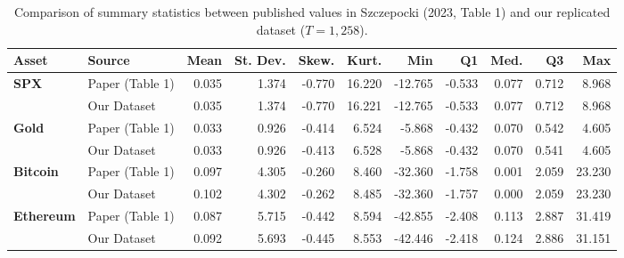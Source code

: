 \begin{table}[htbp]
\centering
\small
\caption{Comparison of summary statistics between published values in Szczepocki (2023, Table 1) and our replicated dataset ($T = 1{,}258$).}
\label{tab:comparison}
\vspace{0.5em}
\begin{tabular}{llrrrrrrrrr}
\toprule
\textbf{Asset} & \textbf{Source} & \textbf{Mean} & \textbf{St. Dev.} & \textbf{Skew.} & \textbf{Kurt.} & \textbf{Min} & \textbf{Q1} & \textbf{Med.} & \textbf{Q3} & \textbf{Max} \\
\midrule
\textbf{SPX}      & Paper (Table 1) & 0.035 & 1.374 & -0.770 & 16.220 & -12.765 & -0.533 & 0.077 & 0.712 &  8.968 \\
                  & Our Dataset     & 0.035 & 1.374 & -0.770 & 16.221 & -12.765 & -0.533 & 0.077 & 0.712 &  8.968 \\
\addlinespace
\textbf{Gold}     & Paper (Table 1) & 0.033 & 0.926 & -0.414 &  6.524 &  -5.868 & -0.432 & 0.070 & 0.542 &  4.605 \\
                  & Our Dataset     & 0.033 & 0.926 & -0.413 &  6.528 &  -5.868 & -0.432 & 0.070 & 0.541 &  4.605 \\
\addlinespace
\textbf{Bitcoin}  & Paper (Table 1) & 0.097 & 4.305 & -0.260 &  8.460 & -32.360 & -1.758 & 0.001 & 2.059 & 23.230 \\
                  & Our Dataset     & 0.102 & 4.302 & -0.262 &  8.485 & -32.360 & -1.757 & 0.000 & 2.059 & 23.230 \\
\addlinespace
\textbf{Ethereum} & Paper (Table 1) & 0.087 & 5.715 & -0.442 &  8.594 & -42.855 & -2.408 & 0.113 & 2.887 & 31.419 \\
                  & Our Dataset     & 0.092 & 5.693 & -0.445 &  8.553 & -42.446 & -2.418 & 0.124 & 2.886 & 31.151 \\
\bottomrule
\end{tabular}
\end{table}
